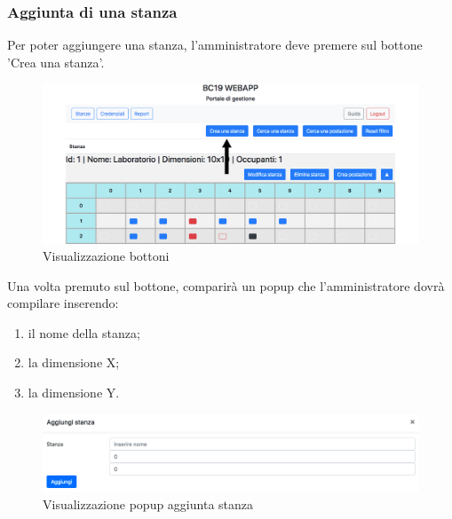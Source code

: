 \subsubsection{Aggiunta di una stanza}
Per poter aggiungere una stanza, l'amministratore deve premere sul bottone 'Crea una stanza'.
\begin{figure}[H]
	\centering
	\includegraphics[width=15cm]{res/images/bottoneAddRoom.png}
	\caption{Visualizzazione bottoni}
\end{figure}
Una volta premuto sul bottone, comparirà un popup che l'amministratore dovrà compilare inserendo:
\begin{enumerate}
	\item il nome della stanza;
	\item la dimensione X;
	\item la dimensione Y.
\end{enumerate}
\begin{figure}[H]
	\centering
	\includegraphics[width=15cm]{res/images/aggiungiStanza1.png}
	\caption{Visualizzazione popup aggiunta stanza}
\end{figure}

